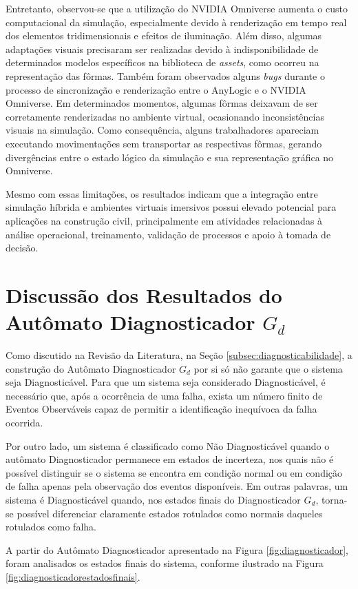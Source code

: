 Entretanto, observou-se que a utilização do NVIDIA Omniverse aumenta o custo computacional da simulação, especialmente devido à renderização em tempo real dos elementos tridimensionais e efeitos de iluminação. Além disso, algumas adaptações visuais precisaram ser realizadas devido à indisponibilidade de determinados modelos específicos na biblioteca de \textit{assets}, como ocorreu na representação das fôrmas. Também foram observados alguns \textit{bugs} durante o processo de sincronização e renderização entre o AnyLogic e o NVIDIA Omniverse. Em determinados momentos, algumas fôrmas deixavam de ser corretamente renderizadas no ambiente virtual, ocasionando inconsistências visuais na simulação. Como consequência, alguns trabalhadores apareciam executando movimentações sem transportar as respectivas fôrmas, gerando divergências entre o estado lógico da simulação e sua representação gráfica no Omniverse.

Mesmo com essas limitações, os resultados indicam que a integração entre simulação híbrida e ambientes virtuais imersivos possui elevado potencial para aplicações na construção civil, principalmente em atividades relacionadas à análise operacional, treinamento, validação de processos e apoio à tomada de decisão.

\section{Discussão dos Resultados do Autômato Diagnosticador $G_d$}

Como discutido na Revisão da Literatura, na Seção \ref{subsec:diagnosticabilidade}, a construção do Autômato Diagnosticador $G_d$ por si só não garante que o sistema seja Diagnosticável. Para que um sistema seja considerado Diagnosticável, é necessário que, após a ocorrência de uma falha, exista um número finito de Eventos Observáveis capaz de permitir a identificação inequívoca da falha ocorrida.

Por outro lado, um sistema é classificado como Não Diagnosticável quando o autômato Diagnosticador permanece em estados de incerteza, nos quais não é possível distinguir se o sistema se encontra em condição normal ou em condição de falha apenas pela observação dos eventos disponíveis. Em outras palavras, um sistema é Diagnosticável quando, nos estados finais do Diagnosticador $G_d$, torna-se possível diferenciar claramente estados rotulados como normais daqueles rotulados como falha.

A partir do Autômato Diagnosticador apresentado na Figura \ref{fig:diagnosticador}, foram analisados os estados finais do sistema, conforme ilustrado na Figura \ref{fig:diagnosticadorestadosfinais}.


